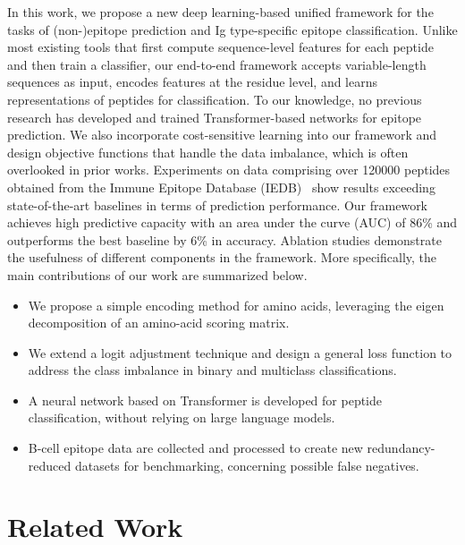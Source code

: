 \documentclass[runningheads]{llncs}
\begin{document}
In this work, we propose a new deep learning-based unified framework for the tasks of (non-)epitope prediction and Ig type-specific epitope classification. Unlike most existing tools that first compute sequence-level features for each peptide and then train a classifier, our end-to-end framework accepts variable-length sequences as input, encodes features at the residue level, and learns representations of peptides for classification. To our knowledge, no previous research has developed and trained Transformer-based networks for epitope prediction. We also incorporate cost-sensitive learning into our framework and design objective functions that handle the data imbalance, which is often overlooked in prior works. Experiments on data comprising over 120000 peptides obtained from the Immune Epitope Database (IEDB)~\cite{vita2019immune} show results exceeding state-of-the-art baselines in terms of prediction performance. Our framework achieves high predictive capacity with an area under the curve (AUC) of 86\% and outperforms the best baseline by 6\% in accuracy. Ablation studies demonstrate the usefulness of different components in the framework. More specifically, the main contributions of our work are summarized below.
\begin{itemize}
\item We propose a simple encoding method for amino acids, leveraging the eigen decomposition of an amino-acid scoring matrix.
\item We extend a logit adjustment technique and design a general loss function to address the class imbalance in binary and multiclass classifications.
\item A neural network based on Transformer is developed for peptide classification, without relying on large language models.
\item B-cell epitope data are collected and processed to create new redundancy-reduced datasets for benchmarking, concerning possible false negatives.
\end{itemize}

\section{Related Work}
\end{document}
